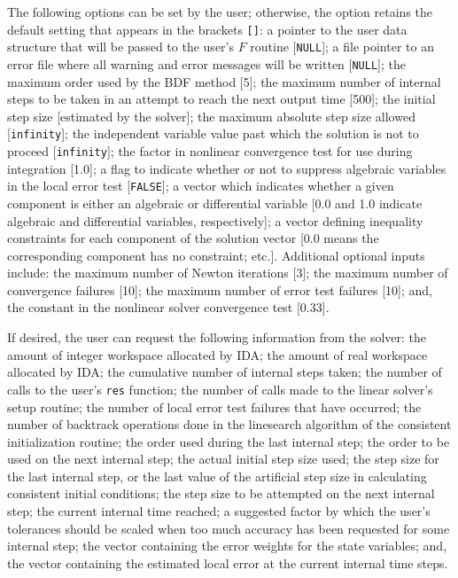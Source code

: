 The following options can be set by the user; otherwise, the option
retains the default setting that appears in the brackets {\tt []}:
a pointer to the user data structure that will be passed to the user's
$F$ routine [{\tt NULL}]; a file pointer to an error file where
all warning and error messages will be written [{\tt NULL}]; the
maximum order used by the BDF method [5]; the maximum number of
internal steps to be taken in an attempt to reach the next output time
[500]; the initial step size [estimated by the solver]; the maximum
absolute step size allowed [{\tt infinity}]; the independent variable
value past which the solution is not to proceed [{\tt infinity}]; the
factor in nonlinear convergence test for use during integration [1.0];
a flag to indicate whether or not to suppress algebraic variables in
the local error test [{\tt FALSE}]; a vector which indicates whether a
given component is either an algebraic or differential variable [0.0
and 1.0 indicate algebraic and differential variables, respectively];
a vector defining inequality constraints for each component of the
solution vector [0.0 means the corresponding component has no
constraint; etc.].
Additional optional inputs include: the maximum number of Newton
iterations [3]; the maximum number of convergence failures [10]; the
maximum number of error test failures [10]; and, the constant in the
nonlinear solver convergence test [0.33].

If desired, the user can request the following information from the
solver: the amount of integer workspace allocated by IDA; the amount
of real workspace allocated by IDA; the cumulative number of internal
steps taken; the number of calls to the user's {\tt res} function; the
number of calls made to the linear solver's setup routine; the number
of local error test failures that have occurred; the number of
backtrack operations done in the linesearch algorithm of the
consistent initialization routine; the order used during the last
internal step; the order to be used on the next internal step; the
actual initial step size used; the step size for the last internal
step, or the last value of the artificial step size in calculating
consistent initial conditions; the step size to be attempted on the
next internal step; the current internal time reached; a suggested
factor by which the user's tolerances should be scaled when too much
accuracy has been requested for some internal step; the vector
containing the error weights for the state variables; and, the vector
containing the estimated local error at the current internal time steps.

